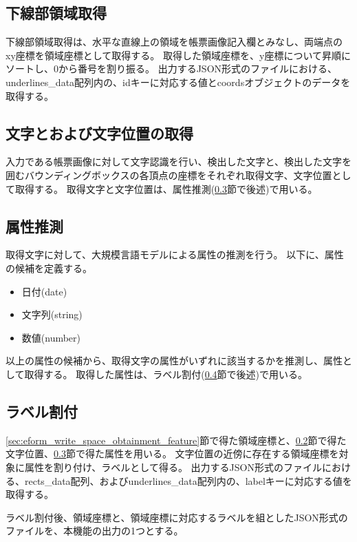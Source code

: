 \subsection{下線部領域取得}\label{subsec:underline_coords_obtainment}
下線部領域取得は、水平な直線上の領域を帳票画像記入欄とみなし、両端点のxy座標を領域座標として取得する。
取得した領域座標を、y座標について昇順にソートし、0から番号を割り振る。
出力するJSON形式のファイルにおける、underlines\_data配列内の、idキーに対応する値とcoordsオブジェクトのデータを取得する。

\subsection{文字とおよび文字位置の取得}\label{subsec:char_and_bbox_obtainment}
入力である帳票画像に対して文字認識を行い、検出した文字と、検出した文字を囲むバウンディングボックスの各頂点の座標をそれぞれ取得文字、文字位置として取得する。
取得文字と文字位置は、属性推測(\ref{subsec:att_prediction}節で後述)で用いる。

\subsection{属性推測}\label{subsec:att_prediction}
取得文字に対して、大規模言語モデルによる属性の推測を行う。
以下に、属性の候補を定義する。

\begin{itemize}
    \item 日付(date)
    \item 文字列(string)
    \item 数値(number)
\end{itemize}

以上の属性の候補から、取得文字の属性がいずれに該当するかを推測し、属性として取得する。
取得した属性は、ラベル割付(\ref{subsec:label_link}節で後述)で用いる。

\subsection{ラベル割付}\label{subsec:label_link}
\ref{sec:eform_write_space_obtainment_feature}節で得た領域座標と、\ref{subsec:char_and_bbox_obtainment}節で得た文字位置、\ref{subsec:att_prediction}節で得た属性を用いる。
文字位置の近傍に存在する領域座標を対象に属性を割り付け、ラベルとして得る。
出力するJSON形式のファイルにおける、rects\_data配列、およびunderlines\_data配列内の、labelキーに対応する値を取得する。

ラベル割付後、領域座標と、領域座標に対応するラベルを組としたJSON形式のファイルを、本機能の出力の1つとする。


